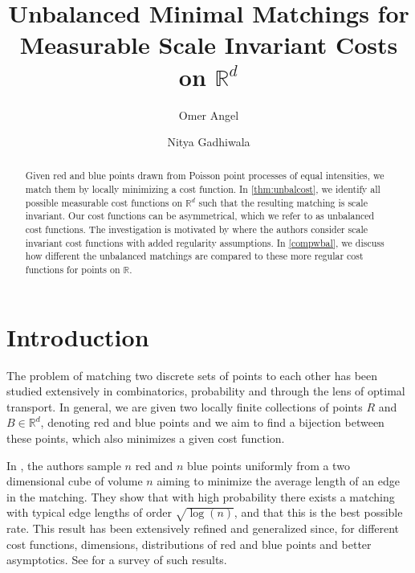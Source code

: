 \documentclass{article}
\title{Unbalanced Minimal Matchings for Measurable Scale Invariant Costs on
  $\mathbb{R}^d$ }
\author{Omer Angel \and Nitya Gadhiwala}
\newcommand{\R}{\mathbb{R}}
\begin{document}
\maketitle

\begin{abstract}
Given red and blue points drawn from Poisson point processes of equal
intensities, we match them by locally minimizing a cost function. In
\cref{thm:unbalcost}, we
identify all possible measurable cost functions on $\R^d$ such that the
resulting matching is scale invariant. %
Our cost functions can be asymmetrical, which we refer to as
unbalanced cost functions. The investigation is motivated by
\cite{minimal} where the authors consider scale invariant cost
functions with added regularity assumptions. In \cref{compwbal}, we
discuss how different the unbalanced matchings are compared to these
more regular cost functions for points on $\R$.
\end{abstract}


\tableofcontents

\section{Introduction}


The problem of matching two discrete sets of points to each other has
been studied extensively in combinatorics, probability and
through the lens of optimal transport. In general, we are given two
locally finite collections of points $R$ and $B \in \R^d$, denoting red and
blue points and we aim to find a bijection between these
points, which also  minimizes a given cost function.


In \cite{ajtai1984optimal}, the authors sample $n$ red and $n$ blue points
uniformly from a two dimensional cube of volume $n$ aiming to minimize
the average length of an edge in the matching. They show that with high
probability there exists a matching with typical edge lengths of order
$\sqrt{\log(n)}$, and that this is the best possible rate. This result
has been extensively refined and generalized since, for different cost
functions, dimensions, distributions of red and blue points and better
asymptotics. See \cite{ledoux23,bb2013} for a survey of such results.
\end{document}
